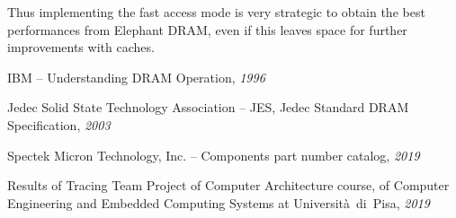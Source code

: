 \documentclass[a4paper,12pt]{article}
\newcommand{\memoryname}{Elephant}
\begin{document}
Thus implementing the fast access mode is very strategic to obtain the best performances from \memoryname{} DRAM, even if this leaves space for further improvements with caches.

\clearpage

\begin{thebibliography}{0}
IBM -- Understanding DRAM Operation, \textit{1996}

Jedec Solid State Technology Association -- JES, Jedec Standard DRAM Specification, \textit{2003}

Spectek Micron Technology, Inc. -- Components part number catalog, \textit{2019}

Results of Tracing Team Project of Computer Architecture course, of Computer Engineering and Embedded Computing Systems at Università~di~Pisa, \textit{2019}

\end{thebibliography}
\end{document}
